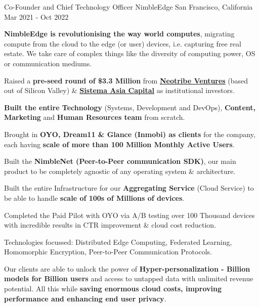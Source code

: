 

\begin{cventries}



  \cventry
    {Co-Founder and Chief Technology Officer} %
    {NimbleEdge} %
    {San Francisco, California} %
    {Mar 2021 - Oct 2022} %
    {
      \begin{cvitems} %
      \item {\textbf{NimbleEdge is revolutionising the way world computes}, migrating compute from the cloud to the edge (or user) devices, i.e. capturing free real estate. We take care of complex things like the diversity of computing power, OS or communication mediums.}
        \item {Raised a \textbf{pre-seed round of \$3.3 Million} from \href{http://www.neotribe.vc/}{\textbf{Neotribe Ventures}} (based out of Silicon Valley) \& \href{https://sistemaasiacapital.com/}{\textbf{Sistema Asia Capital}} as institutional investors.}
        \item {\textbf{Built the entire Technology} (Systems, Development and DevOps), \textbf{Content, Marketing} and \textbf{Human Resources team} from scratch.}
        \item {Brought in \textbf{OYO, Dream11 \& Glance (Inmobi) as clients} for the company, each having \textbf{scale of more than 100 Million Monthly Active Users}.}
        \item {Built the \textbf{NimbleNet (Peer-to-Peer communication SDK)}, our main product to be completely agnostic of any operating system \& architecture.}
        \item {Built the entire Infrastructure for our \textbf{Aggregating Service} (Cloud Service) to be able to handle \textbf{scale of 100s of Millions of devices}.}
        \item {Completed the Paid Pilot with OYO via A/B testing over 100 Thousand devices with incredible results in CTR improvement \& cloud cost reduction.}
        \item {Technologies focussed: Distributed Edge Computing, Federated Learning, Homomorphic Encryption, Peer-to-Peer Communication Protocols.}
        \item {Our clients are able to unlock the power of \textbf{Hyper-personalization - Billion models for Billion users} and access to untapped data with unlimited revenue potential. All this while \textbf{saving enormous cloud costs, improving performance and enhancing end user privacy}.}
      \end{cvitems}
    }


\end{cventries}
